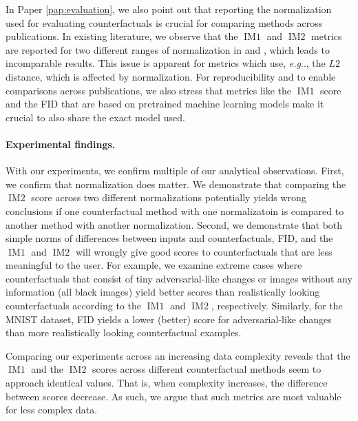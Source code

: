 \documentclass[11pt,a4paper,twoside,openright,final]{memoir}
\makeatletter
\DeclareRobustCommand\onedot{\futurelet\@let@token\@onedot}
\def\@onedot{\ifx\@let@token.\else.\null\fi\xspace}
\def\eg{\emph{e.g}\onedot} \def\Eg{\emph{E.g}\onedot}
\newcommand*{\paperref}[1]{Paper \hyperref[#1]{\ref{#1}}}
\makeatother
\begin{document}
In \paperref{pap:evaluation}, we also point out that reporting the normalization used for evaluating counterfactuals is crucial for comparing methods across publications.
In existing literature, we observe that the $\operatorname{IM1}$ and $\operatorname{IM2}$ metrics are reported for two different ranges of normalization in \cite{Mahajan2019} and \cite{VanLooveren2019}, which leads to incomparable results.
This issue is apparent for metrics which use, \eg, the $L2$ distance, which is affected by normalization.
For reproducibility and to enable comparisons across publications, we also stress that metrics like the $\operatorname{IM1}$ score and the FID that are based on pretrained machine learning models make it crucial to also share the exact model used.

\paragraph{Experimental findings.}
With our experiments, we confirm multiple of our analytical observations.
First, we confirm that normalization does matter.
We demonstrate that comparing the $\operatorname{IM2}$ score across two different normalizations potentially yields wrong conclusions if one counterfactual method with one normalizatoin is compared to another method with another normalization. 
Second, we demonstrate that both simple norms of differences between inputs and counterfactuals, FID, and the $\operatorname{IM1}$ and $\operatorname{IM2}$ will wrongly give good scores to counterfactuals that are less meaningful to the user.
For example, we examine extreme cases where counterfactuals that consist of tiny adversarial-like changes or images without any information (all black images) yield better scores than realistically looking counterfactuals according to the $\operatorname{IM1}$ and $\operatorname{IM2}$, respectively.
Similarly, for the MNIST dataset, FID yields a lower (better) score for adversarial-like changes than more realistically looking counterfactual examples.

Comparing our experiments across an increasing data complexity reveals that the $\operatorname{IM1}$ and the $\operatorname{IM2}$ scores across different counterfactual methods seem to approach identical values.
That is, when complexity increases, the difference between scores decrease.
As such, we argue that such metrics are most valuable for less complex data.
\end{document}
